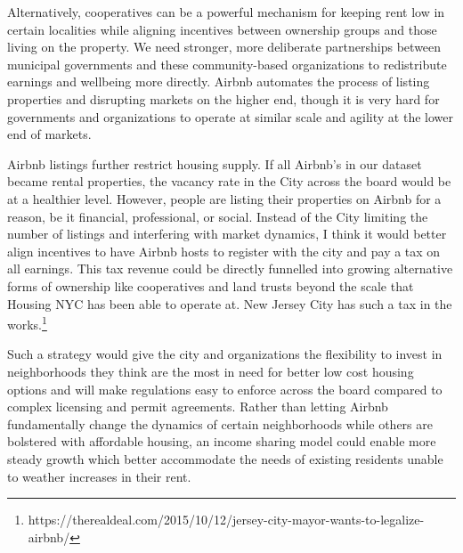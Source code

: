 \documentclass[12pt]{article}
\begin{document}
Alternatively, cooperatives can be a powerful mechanism for keeping rent low in certain localities while aligning incentives between ownership groups and those living on the property. We need stronger, more deliberate partnerships between municipal governments and these community-based organizations to redistribute earnings and wellbeing more directly. Airbnb automates the process of listing properties and disrupting markets on the higher end, though it is very hard for governments and organizations to operate at similar scale and agility at the lower end of markets.

Airbnb listings further restrict housing supply. If all Airbnb's in our dataset became rental properties, the vacancy rate in the City across the board would be at a healthier level. However, people are listing their properties on Airbnb for a reason, be it financial, professional, or social. Instead of the City limiting the number of listings and interfering with market dynamics, I think it would better align incentives to have Airbnb hosts to register with the city and pay a tax on all earnings. This tax revenue could be directly funnelled into growing alternative forms of ownership like cooperatives and land trusts beyond the scale that Housing NYC has been able to operate at. New Jersey City has such a tax in the works.\footnote{https://therealdeal.com/2015/10/12/jersey-city-mayor-wants-to-legalize-airbnb/}

Such a strategy would give the city and organizations the flexibility to invest in neighborhoods they think are the most in need for better low cost housing options and will make regulations easy to enforce across the board compared to complex licensing and permit agreements. Rather than letting Airbnb fundamentally change the dynamics of certain neighborhoods while others are bolstered with affordable housing, an income sharing model could enable more steady growth which better accommodate the needs of existing residents unable to weather increases in their rent.
 
\end{document}
